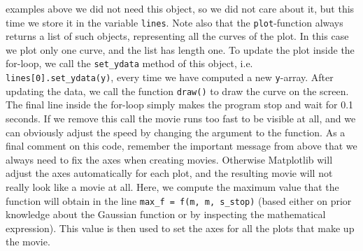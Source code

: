 \documentclass[graybox,envcountchap,sectrefs,final]{svmonodo}
\begin{document}
examples above we did not need this object, so we did not care about it, but this time we store it
in the variable \texttt{lines}.
Note also that the \texttt{plot}-function always returns a list of such objects, representing all the curves
of the plot. In this case we plot
only one curve, and the list has length one.
To update the plot inside the for-loop, we call the \Verb!set_ydata! method of this object, i.e.
\Verb!lines[0].set_ydata(y)!, every time we have computed a new \texttt{y}-array. After updating the data, we call
the function \texttt{draw()} to draw the curve on the screen. The final line inside the for-loop
simply makes the program stop and wait for 0.1 seconds. If we remove this call the movie runs too fast to
be visible at all, and we can obviously adjust the speed by changing the argument to the function.
As a final comment on this code, remember the important message from above that we always need to fix the
axes when creating movies. Otherwise Matplotlib will adjust the axes automatically for each plot,
and the resulting movie will not really look like a movie at all. Here, we compute the maximum value that the
function will obtain in the line \Verb!max_f = f(m, m, s_stop)! (based either on prior knowledge about the
Gaussian function or by inspecting the mathematical expression). This value is then used to set the axes
for all the plots that make up the movie.
\end{document}
